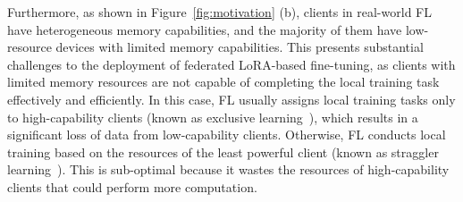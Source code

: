 \documentclass[lettersize,journal]{IEEEtran}
\begin{document}
% 
Furthermore, as shown in Figure~\ref{fig:motivation} (b), clients in real-world FL have heterogeneous memory capabilities, and the majority of them have low-resource devices with limited memory capabilities.
This presents substantial challenges to the deployment of federated LoRA-based fine-tuning, as clients with limited memory resources are not capable of completing the local training task effectively and efficiently. 
%
%
%
%
In this case, FL usually assigns local training tasks only to high-capability clients (known as exclusive learning~\cite{kim2022depthfl}), which results in a significant loss of data from low-capability clients. Otherwise, FL conducts local training based on the resources of the least powerful client (known as straggler learning~\cite{mitliagkas2016asynchrony}). This is sub-optimal because it wastes the resources of high-capability clients that could perform more computation. 
\end{document}
